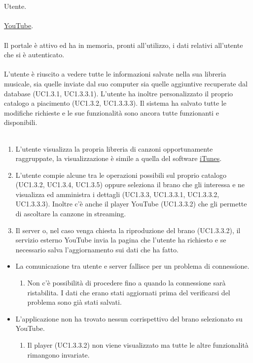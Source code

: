 \vspace*{0.5cm}
 \\\\
 Utente. \\\\
 \underline{YouTube}. \\\\
 Il portale \`e attivo ed ha in memoria, pronti all'utilizzo,
i dati relativi all'utente che si \`e autenticato.  \\\\ 
 L'utente \`e riuscito a vedere tutte le informazioni
salvate nella sua libreria musicale, sia quelle inviate dal suo computer sia
quelle aggiuntive recuperate dal database (UC1.3.1, UC1.3.3.1). L'utente ha
inoltre personalizzato il proprio catalogo a piacimento (UC1.3.2, UC1.3.3.3).
Il sistema ha salvato tutte le modifiche richieste e le sue funzionalit\`a sono
ancora tutte funzionanti e disponibili. \\\\
\begin{enumerate}
  \item L'utente visualizza la propria libreria di canzoni
  opportunamente raggruppate, la visualizzazione \`e simile a quella
  del software \underline{iTunes}.
  \item L'utente compie alcune tra le operazioni possibili sul proprio
  catalogo (UC1.3.2, UC1.3.4, UC1.3.5) oppure seleziona il brano che gli
  interessa e ne visualizza ed amministra i dettagli (UC1.3.3, UC1.3.3.1,
  UC1.3.3.2, UC1.3.3.3). Inoltre c'\`e anche il player YouTube (UC1.3.3.2) che
  gli permette di ascoltare la canzone in streaming.
  \item Il server o, nel caso venga chiesta la riproduzione del brano (UC1.3.3.2), il
  servizio esterno YouTube invia la pagina che l'utente ha richiesto e se
  necessario salva l'aggiornamento sui dati che ha fatto.
\end{enumerate}
\begin{itemize}
  \item La comunicazione tra utente e server fallisce per un problema di
  connessione.
  \begin {enumerate}
    \item Non c'\`e possibilit\`a di procedere fino a quando la connessione sar\`a
    ristabilita. I dati che erano stati aggiornati prima del verificarsi del
    problema sono gi\`a stati salvati.
  \end{enumerate}
  \item L'applicazione non ha trovato nessun corrispettivo del brano
  selezionato su YouTube.
  \begin {enumerate}
    \item Il player (UC1.3.3.2) non viene visualizzato ma tutte le altre
    funzionalit\`a rimangono invariate.
  \end{enumerate}
\end{itemize}
\newpage


